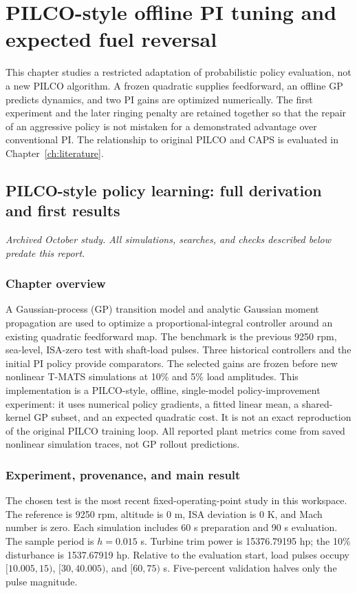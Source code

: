 \chapter{PILCO-style offline PI tuning and expected fuel reversal}
\label{ch:policy}
This chapter studies a restricted adaptation of probabilistic policy evaluation, not a new PILCO algorithm. A frozen quadratic supplies feedforward, an offline GP predicts dynamics, and two PI gains are optimized numerically. The first experiment and the later ringing penalty are retained together so that the repair of an aggressive policy is not mistaken for a demonstrated advantage over conventional PI. The relationship to original PILCO and CAPS is evaluated in Chapter~\ref{ch:literature}.

\section{PILCO-style policy learning: full derivation and first results}
\textit{Archived October study. All simulations, searches, and checks described below predate this report.}\par

\subsection*{Chapter overview}
A Gaussian-process (GP) transition model and analytic Gaussian moment propagation are used to optimize a proportional-integral controller around an existing quadratic feedforward map. The benchmark is the previous 9250 rpm, sea-level, ISA-zero test with shaft-load pulses. Three historical controllers and the initial PI policy provide comparators. The selected gains are frozen before new nonlinear T-MATS simulations at 10\% and 5\% load amplitudes. This implementation is a PILCO-style, offline, single-model policy-improvement experiment: it uses numerical policy gradients, a fitted linear mean, a shared-kernel GP subset, and an expected quadratic cost. It is not an exact reproduction of the original PILCO training loop. All reported plant metrics come from saved nonlinear simulation traces, not GP rollout predictions.

\subsection{Experiment, provenance, and main result}
The chosen test is the most recent fixed-operating-point study in this workspace. The reference is 9250 rpm, altitude is 0 m, ISA deviation is 0 K, and Mach number is zero. Each simulation includes 60 s preparation and 90 s evaluation. The sample period is $h=0.015$ s. Turbine trim power is 15376.79195 hp; the 10\% disturbance is 1537.67919 hp. Relative to the evaluation start, load pulses occupy $[10.005,15)$, $[30,40.005)$, and $[60,75)$ s. Five-percent validation halves only the pulse magnitude.

